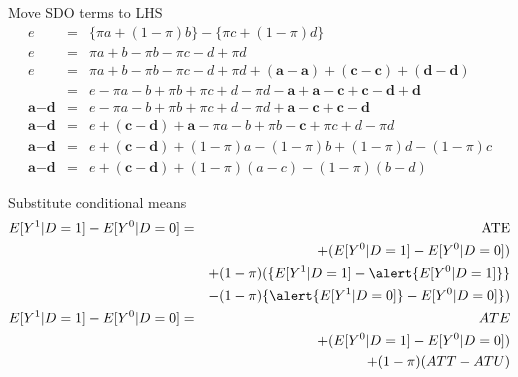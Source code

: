 \documentclass[notes=show]{beamer}
\begin{document}
\begin{frame}[plain, shrink=20]

	\begin{block}{Move SDO terms to LHS}
		\begin{eqnarray*}
		e&=&\{\pi{a} + (1-\pi)b\} - \{\pi{c} + (1-\pi)d\}  \\
		e&=&\pi{a} + b - \pi{b} - \pi{c} - d + \pi{d}  \\
		e&=&\pi{a} + b - \pi{b} - \pi{c} - d + \pi{d} + (\textbf{a} - \textbf{a}) + (\textbf{c} - \textbf{c}) + (\textbf{d} - \textbf{d})  \\
		&=&e-\pi{a} - b + \pi{b} + \pi{c} + d - \pi{d} - \textbf{a} + \textbf{a} - \textbf{c} + \textbf{c} - \textbf{d} + \textbf{d}  \\
		\textbf{a}-\textbf{d}&=&e-\pi{a} - b + \pi{b} + \pi{c} + d - \pi{d}  + \textbf{a} - \textbf{c} + \textbf{c} - \textbf{d}  \\
		\textbf{a}-\textbf{d}&=&e  + (\textbf{c} - \textbf{d}) + \textbf{a}-\pi{a} - b + \pi{b} - \textbf{c} + \pi{c} + d - \pi{d} \\
		\textbf{a}-\textbf{d}&=&e  + (\textbf{c} - \textbf{d}) + (1-\pi)a -(1-\pi)b + (1-\pi)d - (1-\pi)c  \\
		\textbf{a}-\textbf{d}&=&e  + (\textbf{c} - \textbf{d}) + (1-\pi)(a-c) -(1-\pi)(b-d)  
		\end{eqnarray*}
	\end{block}

	\begin{block}{Substitute conditional means}
		\begin{eqnarray*}
		E[Y^1|D=1] - E[Y^0|D=0] &=& \text{ATE}  \\
		&&+ (E[Y^0|D=1] - E[Y^0|D=0])  \\
		&& + (1-\pi)(\{E[Y^1|D=1] - \alert{E[Y^0|D=1]}\}  \\
		&& - (1-\pi)\{\alert{E[Y^1|D=0]} - E[Y^0|D=0]\}) \\
		E[Y^1 | D=1] - E[Y^0 | D=0]  &=& ATE \\
		&&+ (E[Y^0|D=1] - E[Y^0|D=0])  \\
		&& + (1-\pi)(ATT - ATU) 
		\end{eqnarray*}
	\end{block}	
	
\end{frame}
\end{document}
